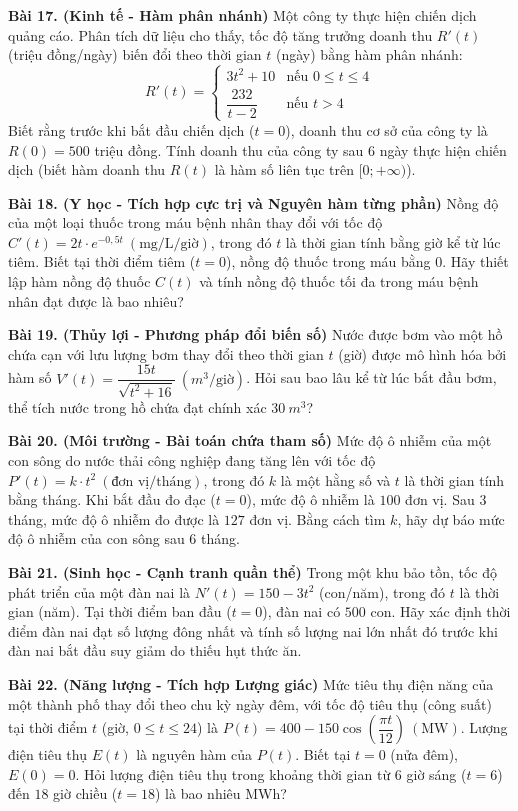\documentclass[12pt]{article}
\begin{document}
	\begin{btdo}[]
		\textbf{Bài 17. (Kinh tế - Hàm phân nhánh)} Một công ty thực hiện chiến dịch quảng cáo. Phân tích dữ liệu cho thấy, tốc độ tăng trưởng doanh thu $R'(t)$ (triệu đồng/ngày) biến đổi theo thời gian $t$ (ngày) bằng hàm phân nhánh:
		$$R'(t) = \begin{cases} 3t^2 + 10 & \text{nếu } 0 \le t \le 4 \\ \dfrac{232}{t - 2} & \text{nếu } t > 4 \end{cases}$$
		Biết rằng trước khi bắt đầu chiến dịch ($t = 0$), doanh thu cơ sở của công ty là $R(0) = 500$ triệu đồng. Tính doanh thu của công ty sau $6$ ngày thực hiện chiến dịch (biết hàm doanh thu $R(t)$ là hàm số liên tục trên $[0; +\infty)$).
		
		\textbf{Bài 18. (Y học - Tích hợp cực trị và Nguyên hàm từng phần)} Nồng độ của một loại thuốc trong máu bệnh nhân thay đổi với tốc độ $C'(t) = 2t \cdot e^{-0,5t} \ (\text{mg/L/giờ})$, trong đó $t$ là thời gian tính bằng giờ kể từ lúc tiêm. Biết tại thời điểm tiêm ($t = 0$), nồng độ thuốc trong máu bằng $0$. Hãy thiết lập hàm nồng độ thuốc $C(t)$ và tính nồng độ thuốc tối đa trong máu bệnh nhân đạt được là bao nhiêu?
		
		\textbf{Bài 19. (Thủy lợi - Phương pháp đổi biến số)} Nước được bơm vào một hồ chứa cạn với lưu lượng bơm thay đổi theo thời gian $t$ (giờ) được mô hình hóa bởi hàm số $V'(t) = \dfrac{15t}{\sqrt{t^2 + 16}} \ (m^3/\text{giờ})$. Hỏi sau bao lâu kể từ lúc bắt đầu bơm, thể tích nước trong hồ chứa đạt chính xác $30 \ m^3$?
		
		\textbf{Bài 20. (Môi trường - Bài toán chứa tham số)} Mức độ ô nhiễm của một con sông do nước thải công nghiệp đang tăng lên với tốc độ $P'(t) = k \cdot t^2 \ (\text{đơn vị/tháng})$, trong đó $k$ là một hằng số và $t$ là thời gian tính bằng tháng. Khi bắt đầu đo đạc ($t = 0$), mức độ ô nhiễm là $100$ đơn vị. Sau $3$ tháng, mức độ ô nhiễm đo được là $127$ đơn vị. Bằng cách tìm $k$, hãy dự báo mức độ ô nhiễm của con sông sau $6$ tháng.
		
		\textbf{Bài 21. (Sinh học - Cạnh tranh quần thể)} Trong một khu bảo tồn, tốc độ phát triển của một đàn nai là $N'(t) = 150 - 3t^2$ (con/năm), trong đó $t$ là thời gian (năm). Tại thời điểm ban đầu ($t = 0$), đàn nai có $500$ con. Hãy xác định thời điểm đàn nai đạt số lượng đông nhất và tính số lượng nai lớn nhất đó trước khi đàn nai bắt đầu suy giảm do thiếu hụt thức ăn.
		
		\textbf{Bài 22. (Năng lượng - Tích hợp Lượng giác)} Mức tiêu thụ điện năng của một thành phố thay đổi theo chu kỳ ngày đêm, với tốc độ tiêu thụ (công suất) tại thời điểm $t$ (giờ, $0 \le t \le 24$) là $P(t) = 400 - 150\cos\left(\dfrac{\pi t}{12}\right) \ (\text{MW})$. Lượng điện tiêu thụ $E(t)$ là nguyên hàm của $P(t)$. Biết tại $t = 0$ (nửa đêm), $E(0) = 0$. Hỏi lượng điện tiêu thụ trong khoảng thời gian từ $6$ giờ sáng ($t = 6$) đến $18$ giờ chiều ($t = 18$) là bao nhiêu MWh?
		

\end{btdo}
\end{document}

